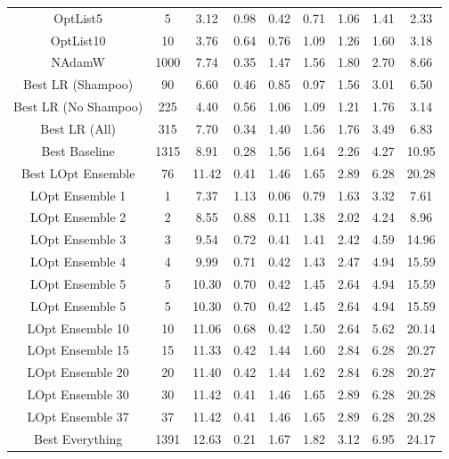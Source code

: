 \begin{tabular}{||c c c c c c c c c||}
\hline
OptList5 & 5 &3.12 & 0.98 & 0.42 & 0.71 & 1.06 & 1.41 & 2.33 \\
OptList10 & 10 &3.76 & 0.64 & 0.76 & 1.09 & 1.26 & 1.60 & 3.18 \\
\hline
NAdamW & 1000 &7.74 & 0.35 & 1.47 & 1.56 & 1.80 & 2.70 & 8.66 \\
\hline
Best LR (Shampoo) & 90 &6.60 & 0.46 & 0.85 & 0.97 & 1.56 & 3.01 & 6.50 \\
Best LR (No Shampoo) & 225 &4.40 & 0.56 & 1.06 & 1.09 & 1.21 & 1.76 & 3.14 \\
Best LR (All) & 315 &7.70 & 0.34 & 1.40 & 1.56 & 1.76 & 3.49 & 6.83 \\
\hline
Best Baseline & 1315 &8.91 & 0.28 & 1.56 & 1.64 & 2.26 & 4.27 & 10.95 \\
\hline
Best LOpt Ensemble & 76 &11.42 & 0.41 & 1.46 & 1.65 & 2.89 & 6.28 & 20.28 \\
\hline
LOpt Ensemble 1 & 1 &7.37 & 1.13 & 0.06 & 0.79 & 1.63 & 3.32 & 7.61 \\
LOpt Ensemble 2 & 2 &8.55 & 0.88 & 0.11 & 1.38 & 2.02 & 4.24 & 8.96 \\
LOpt Ensemble 3 & 3 &9.54 & 0.72 & 0.41 & 1.41 & 2.42 & 4.59 & 14.96 \\
LOpt Ensemble 4 & 4 &9.99 & 0.71 & 0.42 & 1.43 & 2.47 & 4.94 & 15.59 \\
LOpt Ensemble 5 & 5 &10.30 & 0.70 & 0.42 & 1.45 & 2.64 & 4.94 & 15.59 \\
LOpt Ensemble 5 & 5 &10.30 & 0.70 & 0.42 & 1.45 & 2.64 & 4.94 & 15.59 \\
LOpt Ensemble 10 & 10 &11.06 & 0.68 & 0.42 & 1.50 & 2.64 & 5.62 & 20.14 \\
LOpt Ensemble 15 & 15 &11.33 & 0.42 & 1.44 & 1.60 & 2.84 & 6.28 & 20.27 \\
LOpt Ensemble 20 & 20 &11.40 & 0.42 & 1.44 & 1.62 & 2.84 & 6.28 & 20.27 \\
LOpt Ensemble 30 & 30 &11.42 & 0.41 & 1.46 & 1.65 & 2.89 & 6.28 & 20.28 \\
LOpt Ensemble 37 & 37 &11.42 & 0.41 & 1.46 & 1.65 & 2.89 & 6.28 & 20.28 \\
\hline
Best Everything & 1391 &12.63 & 0.21 & 1.67 & 1.82 & 3.12 & 6.95 & 24.17 \\

        \hline
\end{tabular}